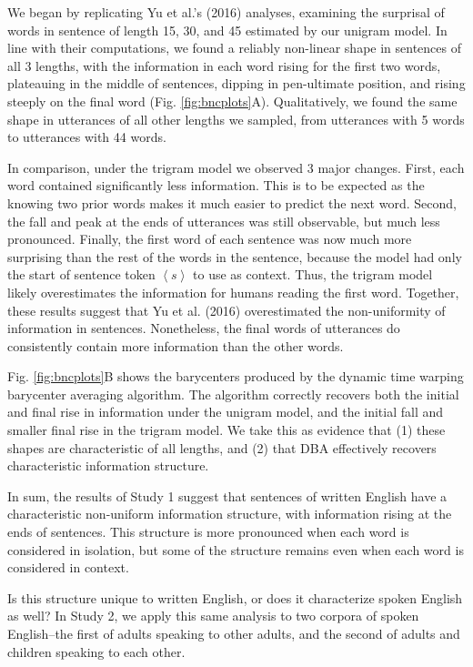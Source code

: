 \documentclass[
  english,
  man,floatsintext]{apa6}
\begin{document}
We began by replicating Yu et al.'s (2016) analyses, examining the surprisal of words in sentence of length 15, 30, and 45 estimated by our unigram model. In line with their computations, we found a reliably non-linear shape in sentences of all 3 lengths, with the information in each word rising for the first two words, plateauing in the middle of sentences, dipping in pen-ultimate position, and rising steeply on the final word (Fig. \ref{fig:bncplots}A). Qualitatively, we found the same shape in utterances of all other lengths we sampled, from utterances with 5 words to utterances with 44 words.

In comparison, under the trigram model we observed 3 major changes. First, each word contained significantly less information. This is to be expected as the knowing two prior words makes it much easier to predict the next word. Second, the fall and peak at the ends of utterances was still observable, but much less pronounced. Finally, the first word of each sentence was now much more surprising than the rest of the words in the sentence, because the model had only the start of sentence token \(\left<s\right>\) to use as context. Thus, the trigram model likely overestimates the information for humans reading the first word. Together, these results suggest that Yu et al. (2016) overestimated the non-uniformity of information in sentences. Nonetheless, the final words of utterances do consistently contain more information than the other words.

Fig. \ref{fig:bncplots}B shows the barycenters produced by the dynamic time warping barycenter averaging algorithm. The algorithm correctly recovers both the initial and final rise in information under the unigram model, and the initial fall and smaller final rise in the trigram model. We take this as evidence that (1) these shapes are characteristic of all lengths, and (2) that DBA effectively recovers characteristic information structure.

In sum, the results of Study 1 suggest that sentences of written English have a characteristic non-uniform information structure, with information rising at the ends of sentences. This structure is more pronounced when each word is considered in isolation, but some of the structure remains even when each word is considered in context.

Is this structure unique to written English, or does it characterize spoken English as well? In Study 2, we apply this same analysis to two corpora of spoken English--the first of adults speaking to other adults, and the second of adults and children speaking to each other.
\end{document}
